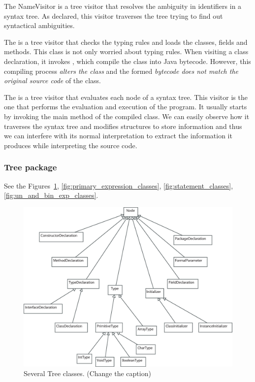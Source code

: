 The NameVisitor is a tree visitor that resolves the ambiguity in identifiers in a syntax tree.
As declared, this visitor traverses the tree trying to find out syntactical ambiguities.

The  is a tree visitor that checks the typing rules and loads the
classes, fields and methods.
This  class is not only worried about typing rules.
When visiting a class declaration, it invokes , which
compile the class into Java bytecode. However, this compiling
process \textit{alters the class} and the formed \textit{bytecode does
not match the original source code} of the class.

The  is a tree visitor that evaluates each node of a syntax tree.
This visitor is the one that performs the evaluation and execution
of the program. It usually starts by invoking the main method
of the compiled class. We can easily observe how it traverses
the syntax tree and modifies \djava{} structures to store information
and thus we can interfere with its normal interpretation to extract
the information it produces while interpreting the source code.

\subsubsection{Tree package}
\label{sec:Tree_package}

See the Figures~\ref{fig:several_tree_classes},
\ref{fig:primary_expression_classes}, \ref{fig:statement_classes},
\ref{fig:un_and_bin_exp_classes}.

\begin{figure}[!htb]
\begin{center}
\includegraphics[width=\textwidth]{images/several.eps}
\caption{Several Tree classes. (Change the caption)}
\label{fig:several_tree_classes}
\end{center}
\end{figure}

